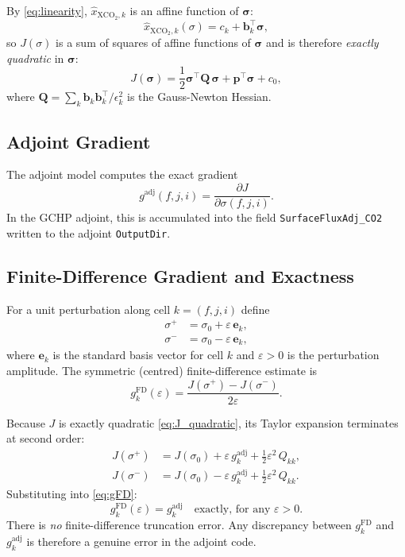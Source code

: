 \documentclass[12pt]{article}
\newcommand{\gfd}{g^{\mathrm{FD}}}
\newcommand{\gadj}{g^{\mathrm{adj}}}
\newcommand{\ek}{\mathbf{e}_k}
\newcommand{\eps}{\varepsilon}
\begin{document}
By \eqref{eq:linearity}, $\hat{x}_{\mathrm{XCO}_2,k}$ is an affine function of
$\bm{\sigma}$:
\begin{equation}
  \hat{x}_{\mathrm{XCO}_2,k}(\sigma) = c_k + \mathbf{b}_k^\top\bm{\sigma},
\end{equation}
so $J(\sigma)$ is a sum of squares of affine functions of $\bm{\sigma}$ and is
therefore \emph{exactly quadratic} in $\bm{\sigma}$:
\begin{equation}
  J(\bm{\sigma}) = \frac{1}{2}\bm{\sigma}^\top \mathbf{Q}\,\bm{\sigma}
                   + \mathbf{p}^\top\bm{\sigma} + c_0,
  \label{eq:J_quadratic}
\end{equation}
where $\mathbf{Q} = \sum_k \mathbf{b}_k\mathbf{b}_k^\top / \epsilon_k^2$
is the Gauss-Newton Hessian.

\subsection{Adjoint Gradient}

The adjoint model computes the exact gradient
\begin{equation}
  \gadj(f,j,i) = \frac{\partial J}{\partial \sigma(f,j,i)}.
  \label{eq:g_adj}
\end{equation}
In the GCHP adjoint, this is accumulated into the field
\texttt{SurfaceFluxAdj\_CO2} written to the adjoint \texttt{OutputDir}.

\subsection{Finite-Difference Gradient and Exactness}

For a unit perturbation along cell $k = (f,j,i)$ define
\begin{align}
  \sigma^{+} &= \sigma_0 + \eps\,\ek, \\
  \sigma^{-} &= \sigma_0 - \eps\,\ek,
\end{align}
where $\ek$ is the standard basis vector for cell $k$ and $\eps > 0$ is the
perturbation amplitude.  The symmetric (centred) finite-difference estimate is
\begin{equation}
  \gfd_k(\eps) = \frac{J(\sigma^{+}) - J(\sigma^{-})}{2\eps}.
  \label{eq:gFD}
\end{equation}

Because $J$ is exactly quadratic \eqref{eq:J_quadratic}, its Taylor expansion
terminates at second order:
\begin{align}
  J(\sigma^{+}) &= J(\sigma_0) + \eps\,\gadj_k
                   + \tfrac{1}{2}\eps^2\,Q_{kk}, \\
  J(\sigma^{-}) &= J(\sigma_0) - \eps\,\gadj_k
                   + \tfrac{1}{2}\eps^2\,Q_{kk}.
\end{align}
Substituting into \eqref{eq:gFD}:
\begin{equation}
  \boxed{\gfd_k(\eps) = \gadj_k \quad \text{exactly, for any } \eps > 0.}
  \label{eq:exactness}
\end{equation}
There is \emph{no} finite-difference truncation error.  Any discrepancy between
$\gfd_k$ and $\gadj_k$ is therefore a genuine error in the adjoint code.
\end{document}
